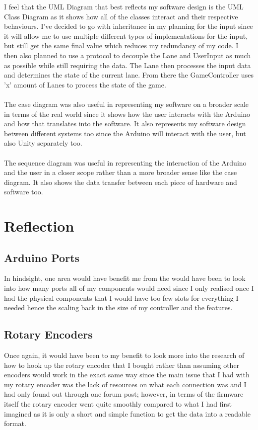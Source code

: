 \documentclass{article}
\begin{document}
I feel that the UML Diagram that best reflects my software design is the UML Class Diagram as it shows how all of the classes interact and their respective behaviours. I've decided to go with inheritance in my planning for the input since it will allow me to use multiple different types of implementations for the input, but still get the same final value which reduces my redundancy of my code. I then also planned to use a protocol to decouple the Lane and UserInput as much as possible while still requiring the data. The Lane then processes the input data and determines the state of the current lane. From there the GameController uses 'x' amount of Lanes to process the state of the game.
\\
\\
The case diagram was also useful in representing my software on a broader scale in terms of the real world since it shows how the user interacts with the Arduino and how that translates into the software. It also represents my software design between different systems too since the Arduino will interact with the user, but also Unity separately too.
\\
\\
The sequence diagram was useful in representing the interaction of the Arduino and the user in a closer scope rather than a more broader sense like the case diagram. It also shows the data transfer between each piece of hardware and software too.

\section{Reflection}

\subsection{Arduino Ports}
In hindsight, one area would have benefit me from the would have been to look into how many ports all of my components would need since I only realised once I had the physical components that I would have too few slots for everything I needed hence the scaling back in the size of my controller and the features.
\\

\subsection{Rotary Encoders}
Once again, it would have been to my benefit to look more into the research of how to hook up the rotary encoder that I bought rather than assuming other encoders would work in the exact same way since the main issue that I had with my rotary encoder was the lack of resources on what each connection was and I had only found out through one forum post; however, in terms of the firmware itself the rotary encoder went quite smoothly compared to what I had first imagined as it is only a short and simple function to get the data into a readable format.
\\
\end{document}
